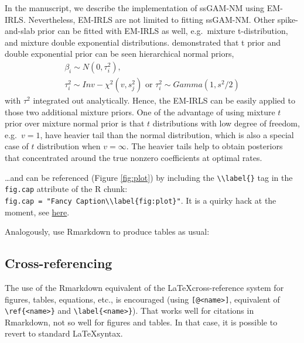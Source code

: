 \documentclass[AMA,STIX1COL,]{WileyNJD-v2}
\begin{document}
In the manuscript, we describe the implementation of ssGAM-NM using
EM-IRLS. Nevertheless, EM-IRLS are not limited to fitting ssGAM-NM.
Other spike-and-slab prior can be fitted with EM-IRLS as well,
e.g.~mixture t-distribution, and mixture double exponential
distributions. \citet{Yi2012} demonstrated that t prior and double
exponential prior can be seen hierarchical normal priors, \[
\begin{aligned}
\beta_i \sim N(0, \tau^2_i),\\
\tau^2_i \sim Inv-\chi^2(v, s^2_j) \text{ or } \tau^2_i \sim Gamma(1, s^2/2)
\end{aligned}
\] with \(\tau^2\) integrated out analytically. Hence, the EM-IRLS can
be easily applied to those two additional mixture priors. One of the
advantage of using mixture \(t\) prior over mixture normal prior is that
\(t\) distributions with low degree of freedom, e.g.~\(v=1\), have
heavier tail than the normal distribution, which is also a special case
of \(t\) distribution when \(v=\infty\). The heavier tails help to
obtain posteriors that concentrated around the true nonzero coefficients
at optimal rates. \citep{Rockova2014a}

\ldots and can be referenced (Figure \ref{fig:plot}) by including the
\texttt{\textbackslash{}\textbackslash{}label\{\}} tag in the
\texttt{fig.cap} attribute of the R chunk:
\texttt{fig.cap\ =\ "Fancy\ Caption\textbackslash{}\textbackslash{}label\{fig:plot\}"}.
It is a quirky hack at the moment, see
\href{https://github.com/yihui/knitr/issues/323}{here}.

Analogously, use Rmarkdown to produce tables as usual:

\hypertarget{cross-referencing}{%
\subsection{Cross-referencing}\label{cross-referencing}}

The use of the Rmarkdown equivalent of the \LaTeX cross-reference system
for figures, tables, equations, etc., is encouraged (using
\texttt{{[}@\textless{}name\textgreater{}{]}}, equivalent of
\texttt{\textbackslash{}ref\{\textless{}name\textgreater{}\}} and
\texttt{\textbackslash{}label\{\textless{}name\textgreater{}\}}). That
works well for citations in Rmarkdown, not so well for figures and
tables. In that case, it is possible to revert to standard
\LaTeX syntax.


\end{document}
